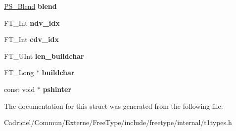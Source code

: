 \begin{DoxyCompactItemize}
\item 
\hyperlink{struct_p_s___blend_rec__}{P\+S\+\_\+\+Blend} {\bfseries blend}\hypertarget{struct_t1___face_rec___a51e4e76f9988ec601d1fec6b5d4611db}{}\label{struct_t1___face_rec___a51e4e76f9988ec601d1fec6b5d4611db}

\item 
F\+T\+\_\+\+Int {\bfseries ndv\+\_\+idx}\hypertarget{struct_t1___face_rec___a0ecadea7618642ccc351f81ac56ec266}{}\label{struct_t1___face_rec___a0ecadea7618642ccc351f81ac56ec266}

\item 
F\+T\+\_\+\+Int {\bfseries cdv\+\_\+idx}\hypertarget{struct_t1___face_rec___a7a77dcddf65ac6d86f1f62b3859d11d8}{}\label{struct_t1___face_rec___a7a77dcddf65ac6d86f1f62b3859d11d8}

\item 
F\+T\+\_\+\+U\+Int {\bfseries len\+\_\+buildchar}\hypertarget{struct_t1___face_rec___a75554021d0baddb1c64f69fd8dbde86b}{}\label{struct_t1___face_rec___a75554021d0baddb1c64f69fd8dbde86b}

\item 
F\+T\+\_\+\+Long $\ast$ {\bfseries buildchar}\hypertarget{struct_t1___face_rec___af1fd890acaa0f423f7cc36807c42d75f}{}\label{struct_t1___face_rec___af1fd890acaa0f423f7cc36807c42d75f}

\item 
const void $\ast$ {\bfseries pshinter}\hypertarget{struct_t1___face_rec___a438e8ce8cbd53b7e205b17f95e7b2106}{}\label{struct_t1___face_rec___a438e8ce8cbd53b7e205b17f95e7b2106}

\end{DoxyCompactItemize}


The documentation for this struct was generated from the following file\+:\begin{DoxyCompactItemize}
\item 
Cadriciel/\+Commun/\+Externe/\+Free\+Type/include/freetype/internal/t1types.\+h\end{DoxyCompactItemize}

